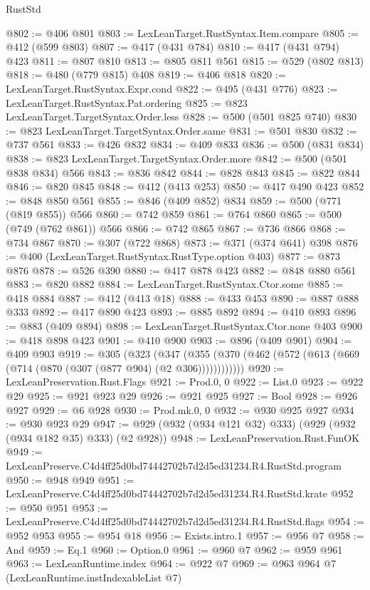 \begin{lexlean}{RustStd}
\begin{coremodule}
@802 := @406 @801
@803 := LexLeanTarget.RustSyntax.Item.compare
@805 := @412 (@599 @803)
@807 := @417 (@431 @784)
@810 := @417 (@431 @794) @423
@811 := @807 @810
@813 := @805 @811 @561
@815 := @529 (@802 @813)
@818 := @480 (@779 @815) @408
@819 := @406 @818
@820 := LexLeanTarget.RustSyntax.Expr.cond
@822 := @495 (@431 @776)
@823 := LexLeanTarget.RustSyntax.Pat.ordering
@825 := @823 LexLeanTarget.TargetSyntax.Order.less
@828 := @500 (@501 @825 @740)
@830 := @823 LexLeanTarget.TargetSyntax.Order.same
@831 := @501 @830
@832 := @737 @561
@833 := @426 @832
@834 := @409 @833
@836 := @500 (@831 @834)
@838 := @823 LexLeanTarget.TargetSyntax.Order.more
@842 := @500 (@501 @838 @834) @566
@843 := @836 @842
@844 := @828 @843
@845 := @822 @844
@846 := @820 @845
@848 := @412 (@413 @253)
@850 := @417 @490 @423
@852 := @848 @850 @561
@855 := @846 (@409 @852) @834
@859 := @500 (@771 (@819 @855)) @566
@860 := @742 @859
@861 := @764 @860
@865 := @500 (@749 (@762 @861)) @566
@866 := @742 @865
@867 := @736 @866
@868 := @734 @867
@870 := @307 (@722 @868)
@873 := @371 (@374 @641) @398
@876 := @400 (LexLeanTarget.RustSyntax.RustType.option @403)
@877 := @873 @876
@878 := @526 @390
@880 := @417 @878 @423
@882 := @848 @880 @561
@883 := @820 @882
@884 := LexLeanTarget.RustSyntax.Ctor.some
@885 := @418 @884
@887 := @412 (@413 @18)
@888 := @433 @453
@890 := @887 @888 @333
@892 := @417 @890 @423
@893 := @885 @892
@894 := @410 @893
@896 := @883 (@409 @894)
@898 := LexLeanTarget.RustSyntax.Ctor.none @403
@900 := @418 @898 @423
@901 := @410 @900
@903 := @896 (@409 @901)
@904 := @409 @903
@919 := @305
    (@323
      (@347 (@355 (@370 (@462 (@572 (@613 (@669 (@714 (@870 (@307 (@877 @904) (@2 @306))))))))))))
@920 := LexLeanPreservation.Rust.Flags
@921 := Prod.{0, 0}
@922 := List.{0}
@923 := @922 @29
@925 := @921 @923 @29
@926 := @921 @925
@927 := Bool
@928 := @926 @927
@929 := @6 @928
@930 := Prod.mk.{0, 0}
@932 := @930 @925 @927
@934 := @930 @923 @29
@947 := @929 (@932 (@934 @121 @32) @333) (@929 (@932 (@934 @182 @35) @333) (@2 @928))
@948 := LexLeanPreservation.Rust.FunOK
@949 := LexLeanPreserve.C4d4ff25d0bd74442702b7d2d5ed31234.R4.RustStd.program
@950 := @948 @949
@951 := LexLeanPreserve.C4d4ff25d0bd74442702b7d2d5ed31234.R4.RustStd.krate
@952 := @950 @951
@953 := LexLeanPreserve.C4d4ff25d0bd74442702b7d2d5ed31234.R4.RustStd.flags
@954 := @952 @953
@955 := @954 @18
@956 := Exists.intro.{1}
@957 := @956 @7
@958 := And
@959 := Eq.{1}
@960 := Option.{0}
@961 := @960 @7
@962 := @959 @961
@963 := LexLeanRuntime.index
@964 := @922 @7
@969 := @963 @964 @7 (LexLeanRuntime.instIndexableList @7)

\end{coremodule}
\end{lexlean}
